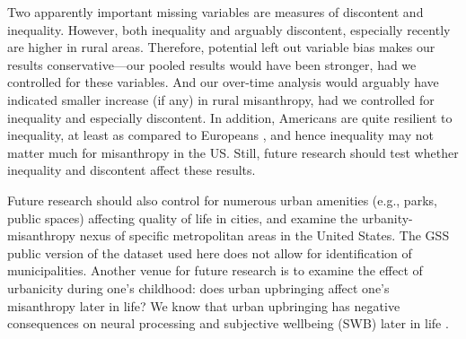 \documentclass[11pt, letterpaper]{article}
\begin{document}
\begin{spacing}{1.4}
Two apparently important missing variables are measures of discontent and
inequality. However, both inequality \citep[e.g.,][]{daleyMISCNYT20apr14} %
and arguably discontent, especially recently 
\citep[e.g.,][]{case15,hansonCityJournalautumn15,fullerNYT17monD} 
%
 are higher in rural areas. Therefore, potential left out variable bias makes
 our results conservative---our pooled results would have been stronger, had we controlled
 for these variables. 
 And our over-time analysis would arguably have indicated smaller increase (if
 any)  in
 rural misanthropy, had we controlled for inequality and especially discontent.  
 In addition, Americans are  quite
  resilient to inequality, at least as compared to Europeans
  \citep{alesina04al}, and hence inequality may not matter much for
  misanthropy in the US.
Still, future research should test whether inequality and discontent affect these
results. 

Future research should also control for numerous urban amenities (e.g., parks,
public spaces) affecting quality of life in cities, and examine the
urbanity-misanthropy nexus of specific metropolitan areas in the United
States. The GSS public version of the dataset used here does not allow for
identification of municipalities. Another venue for future research is to examine the effect of urbanicity during one's childhood: does urban upbringing affect one's misanthropy later in life? We know that urban upbringing has negative consequences on neural processing and subjective wellbeing (SWB) later in life \citep{lederbogen11,aok20}. 


\end{spacing}
\end{document}
